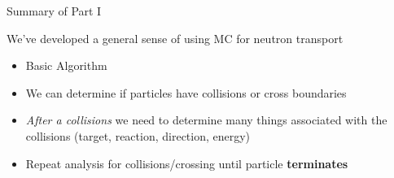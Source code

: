 \documentclass[xcolor=x11names,compress,handout]{beamer}
\renewcommand{\(}{\begin{columns}}
\renewcommand{\)}{\end{columns}}
\newcommand{\<}[1]{\begin{column}{#1}}
\renewcommand{\>}{\end{column}}
\begin{document}
\begin{frame}{Summary of Part I}

We've developed a general sense of using MC for neutron transport
\begin{itemize}
    \item Basic Algorithm
    \pause
    \vspace*{0.5 em}
    \item We can determine if particles have collisions or cross boundaries
    \item \textit{After a collisions} we need to determine many things associated with the collisions (target, reaction, direction, energy)
    \item Repeat analysis for collisions/crossing until particle \textbf{terminates}
\end{itemize}


\end{frame}
\end{document}
